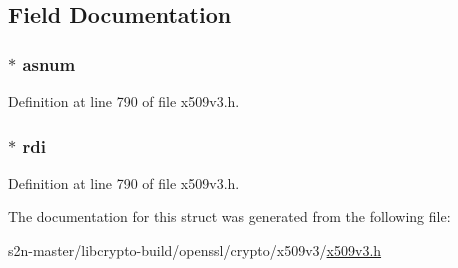 \subsection{Field Documentation}
\subsubsection[{\texorpdfstring{asnum}{asnum}}]{ $\ast$ asnum}\hypertarget{struct_a_s_identifiers__st_a9e9c1371c2681c33188018f2e08acd3d}{}\label{struct_a_s_identifiers__st_a9e9c1371c2681c33188018f2e08acd3d}


Definition at line 790 of file x509v3.\+h.

\subsubsection[{\texorpdfstring{rdi}{rdi}}]{ $\ast$ rdi}\hypertarget{struct_a_s_identifiers__st_aa977a45203a9b1f06efdf18c3fc39a13}{}\label{struct_a_s_identifiers__st_aa977a45203a9b1f06efdf18c3fc39a13}


Definition at line 790 of file x509v3.\+h.



The documentation for this struct was generated from the following file\+:\begin{DoxyCompactItemize}
\item 
s2n-\/master/libcrypto-\/build/openssl/crypto/x509v3/\hyperlink{crypto_2x509v3_2x509v3_8h}{x509v3.\+h}\end{DoxyCompactItemize}
